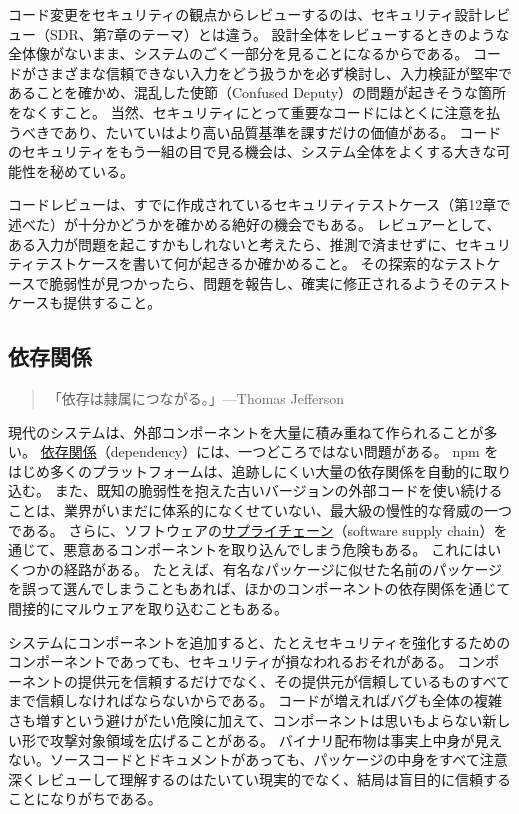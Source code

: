 \documentclass[uplatex]{jsarticle}
\begin{document}
コード変更をセキュリティの観点からレビューするのは、セキュリティ設計レビュー（SDR、第7章のテーマ）とは違う。
設計全体をレビューするときのような全体像がないまま、システムのごく一部分を見ることになるからである。
コードがさまざまな信頼できない入力をどう扱うかを必ず検討し、入力検証が堅牢であることを確かめ、混乱した使節（Confused Deputy）の問題が起きそうな箇所をなくすこと。
当然、セキュリティにとって重要なコードにはとくに注意を払うべきであり、たいていはより高い品質基準を課すだけの価値がある。
コードのセキュリティをもう一組の目で見る機会は、システム全体をよくする大きな可能性を秘めている。

コードレビューは、すでに作成されているセキュリティテストケース（第12章で述べた）が十分かどうかを確かめる絶好の機会でもある。
レビュアーとして、ある入力が問題を起こすかもしれないと考えたら、推測で済ませずに、セキュリティテストケースを書いて何が起きるか確かめること。
その探索的なテストケースで脆弱性が見つかったら、問題を報告し、確実に修正されるようそのテストケースも提供すること。

\subsection{依存関係}

\begin{quote}
「依存は隷属につながる。」---Thomas Jefferson
\end{quote}

現代のシステムは、外部コンポーネントを大量に積み重ねて作られることが多い。
\underline{依存関係}（dependency）には、一つどころではない問題がある。
npm をはじめ多くのプラットフォームは、追跡しにくい大量の依存関係を自動的に取り込む。
また、既知の脆弱性を抱えた古いバージョンの外部コードを使い続けることは、業界がいまだに体系的になくせていない、最大級の慢性的な脅威の一つである。
さらに、ソフトウェアの\underline{サプライチェーン}（software supply chain）を通じて、悪意あるコンポーネントを取り込んでしまう危険もある。
これにはいくつかの経路がある。
たとえば、有名なパッケージに似せた名前のパッケージを誤って選んでしまうこともあれば、ほかのコンポーネントの依存関係を通じて間接的にマルウェアを取り込むこともある。

システムにコンポーネントを追加すると、たとえセキュリティを強化するためのコンポーネントであっても、セキュリティが損なわれるおそれがある。
コンポーネントの提供元を信頼するだけでなく、その提供元が信頼しているものすべてまで信頼しなければならないからである。
コードが増えればバグも全体の複雑さも増すという避けがたい危険に加えて、コンポーネントは思いもよらない新しい形で攻撃対象領域を広げることがある。
バイナリ配布物は事実上中身が見えない。ソースコードとドキュメントがあっても、パッケージの中身をすべて注意深くレビューして理解するのはたいてい現実的でなく、結局は盲目的に信頼することになりがちである。
\end{document}
